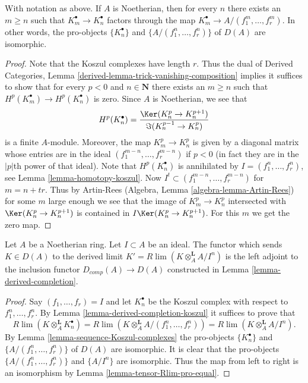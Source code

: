 \begin{lemma}
\label{lemma-sequence-Koszul-complexes}
With notation as above. If $A$ is Noetherian, then for every $n$
there exists an $m \geq n$ such that $K_m^\bullet \to K_n^\bullet$
factors through the map $K_m^\bullet \to A/(f_1^m, \ldots, f_r^m)$.
In other words, the pro-objects $\{K_n^\bullet\}$ and
$\{A/(f_1^n, \ldots, f_r^n)\}$ of $D(A)$ are isomorphic.
\end{lemma}

\begin{proof}
Note that the Koszul complexes have length $r$. Thus the dual of
Derived Categories, Lemma \ref{derived-lemma-trick-vanishing-composition}
implies it suffices to show that for every $p < 0$ and $n \in \mathbf{N}$
there exists an $m \geq n$ such that $H^p(K_m^\bullet) \to H^p(K_n^\bullet)$
is zero. Since $A$ is Noetherian, we see that
$$
H^p(K_n^\bullet) =
\frac{\Ker(K_n^p \to K_n^{p + 1})}{\Im(K_n^{p - 1} \to K_n^p)}
$$
is a finite $A$-module. Moreover, the map $K_m^p \to K_n^p$ is given
by a diagonal matrix whose entries are in the ideal
$(f_1^{m - n}, \ldots, f_r^{m - n})$ if $p < 0$ (in fact they are in the
$|p|$th power of that ideal). Note that $H^p(K_n^\bullet)$ is annihilated by
$I = (f_1^n, \ldots, f_r^n)$, see Lemma \ref{lemma-homotopy-koszul}. Now
$I^t \subset (f_1^{m - n}, \ldots, f_r^{m - n})$ for $m = n + tr$.
Thus by Artin-Rees (Algebra, Lemma \ref{algebra-lemma-Artin-Rees})
for some $m$ large enough we see that
the image of $K_m^p \to K_n^p$ intersected with
$\Ker(K_n^p \to K_n^{p + 1})$ is contained in
$I \Ker(K_n^p \to K_n^{p + 1})$. For this $m$ we get the zero map.
\end{proof}

\begin{proposition}
\label{proposition-noetherian-naive-completion-is-completion}
Let $A$ be a Noetherian ring. Let $I \subset A$ be an ideal.
The functor which sends $K \in D(A)$ to the derived limit
$K' = R\lim( K \otimes_A^\mathbf{L} A/I^n )$ is the left
adjoint to the inclusion functor $D_{comp}(A) \to D(A)$
constructed in Lemma \ref{lemma-derived-completion}.
\end{proposition}

\begin{proof}
Say $(f_1, \ldots, f_r) = I$ and let $K_n^\bullet$ be the Koszul complex
with respect to $f_1^n, \ldots, f_r^n$. By
Lemma \ref{lemma-derived-completion-koszul}
it suffices to prove that
$$
R\lim (K \otimes_A^\mathbf{L} K_n^\bullet) =
R\lim (K \otimes_A^\mathbf{L} A/(f_1^n, \ldots, f_r^n) ) =
R\lim (K \otimes_A^\mathbf{L} A/I^n ).
$$
By Lemma \ref{lemma-sequence-Koszul-complexes} the pro-objects
$\{K_n^\bullet\}$ and $\{A/(f_1^n, \ldots, f_r^n)\}$ of $D(A)$ are
isomorphic. It is clear that the pro-objects
$\{A/(f_1^n, \ldots, f_r^n)\}$ and $\{A/I^n\}$ are isomorphic.
Thus the map from left to right is an isomorphism by
Lemma \ref{lemma-tensor-Rlim-pro-equal}.
\end{proof}


